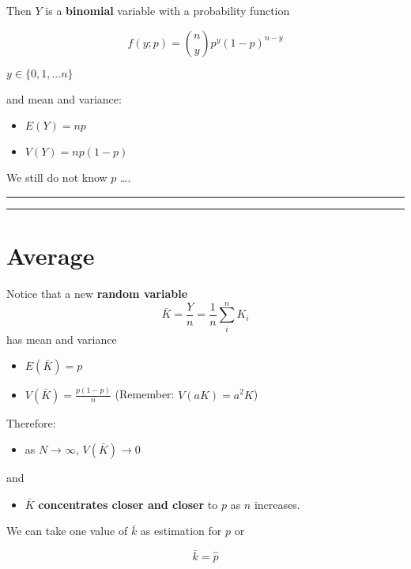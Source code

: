 \documentclass[
]{book}
\providecommand{\tightlist}{%
  \setlength{\itemsep}{0pt}\setlength{\parskip}{0pt}}
\begin{document}
Then \(Y\) is a \textbf{binomial} variable with a probability function

\[f(y; p)=\binom n y p^y(1-p)^{n-y}\]

\(y\in \{0,1,...n\}\)

and mean and variance:

\begin{itemize}
\tightlist
\item
  \(E(Y)=np\)
\item
  \(V(Y)=np(1-p)\)
\end{itemize}

We still do not know \(p\) \ldots.

\begin{center}\rule{0.5\linewidth}{0.5pt}\end{center}

\begin{center}\rule{0.5\linewidth}{0.5pt}\end{center}

\hypertarget{average-3}{%
\section{Average}\label{average-3}}

Notice that a new \textbf{random variable} \[\bar{K}=\frac{Y}{n}=\frac{1}{n}\sum_i^n K_i\] has mean and variance

\begin{itemize}
\tightlist
\item
  \(E(\bar{K})=p\)
\item
  \(V(\bar{K})=\frac{p(1-p)}{n}\) (Remember: \(V(aK)=a^2K\))
\end{itemize}

Therefore:

\begin{itemize}
\tightlist
\item
  as \(N \rightarrow \infty\), \(V(\bar{K}) \rightarrow 0\)
\end{itemize}

and

\begin{itemize}
\tightlist
\item
  \(\bar{K}\) \textbf{concentrates closer and closer} to \(p\) as \(n\) increases.
\end{itemize}

We can take one value of \(\bar{k}\) as estimation for \(p\) or

\[\bar{k}=\hat{p}\]
\end{document}
